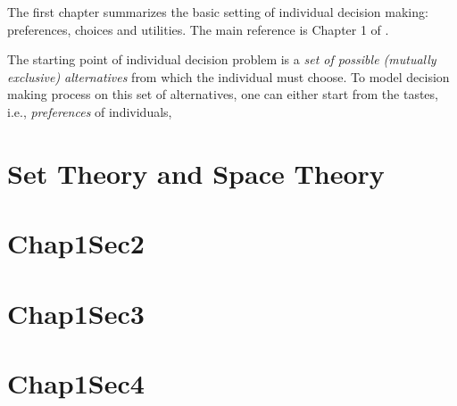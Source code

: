 \minitoc

\vspace{0.5cm}
The first chapter summarizes the basic setting of individual decision making: preferences, choices and utilities. The main reference is Chapter 1 of \citet{mas1995microeconomic}.

The starting point of individual decision problem is a \textit{set of possible (mutually exclusive) alternatives} from which the individual must choose. To model decision making process
on this set of alternatives, one can either start from the tastes, i.e., \textit{preferences} of individuals, 

\section{Set Theory and Space Theory}\label{chap1:set_space}


\section{Chap1Sec2}\label{chap1:sec2}


\section{Chap1Sec3}\label{chap1:sec3}

\section{Chap1Sec4}\label{chap1:sec4}

